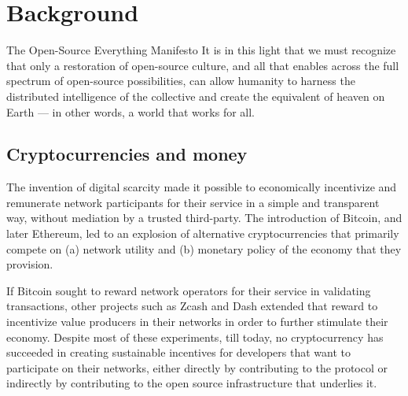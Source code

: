 \section{Background}

\begin{epigraph}{The Open-Source Everything Manifesto}
    \noindent It is in this light that we must recognize that only a restoration of
    open-source culture, and all that enables across the full spectrum of
    open-source possibilities, can allow humanity to harness the distributed
    intelligence of the collective and create the equivalent of heaven on Earth
    --- in other words, a world that works for all.
\end{epigraph}

\subsection{Cryptocurrencies and money}

The invention of digital scarcity made it possible to economically incentivize
and remunerate network participants for their service in a simple and transparent
way, without mediation by a trusted third-party. The introduction of Bitcoin,
and later Ethereum, led to an explosion of alternative cryptocurrencies that
primarily compete on (a) network utility and (b) monetary policy of the economy
that they provision.


If Bitcoin sought to reward network operators for their service in validating
transactions, other projects such as Zcash and Dash extended that reward to
incentivize value producers in their networks in order to further stimulate
their economy. Despite most of these experiments, till today, no cryptocurrency
has succeeded in creating sustainable incentives for developers that want to
participate on their networks, either directly by contributing to the protocol
or indirectly by contributing to the open source infrastructure that underlies
it.

